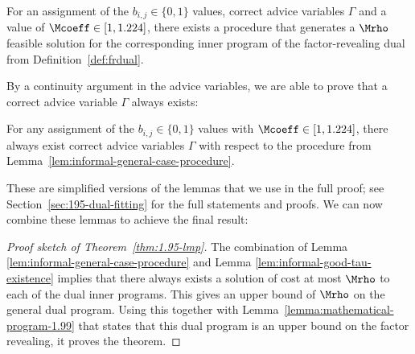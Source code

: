 
\begin{lemma}\label{lem:informal-general-case-procedure}
    For an assignment of the $b_{i,j}\in\{0,1\}$ values, correct advice variables $\Gamma$ and a value of $\Mcoeff\in[1,1.224]$, there exists a procedure that generates a $\Mrho$ feasible solution for the corresponding inner program of the factor-revealing dual from Definition~\ref{def:frdual}.
\end{lemma}

By a continuity argument in the advice variables, we are able to prove that a correct advice variable $\Gamma$ always exists:

\begin{lemma}\label{lem:informal-good-tau-existence}
    For any assignment of the $b_{i,j}\in\{0,1\}$ values with $\Mcoeff\in[1,1.224]$, there always exist correct advice variables $\Gamma$ with respect to the procedure from Lemma~\ref{lem:informal-general-case-procedure}.
\end{lemma}

These are simplified versions of the lemmas that we use in the full proof; see Section~\ref{sec:195-dual-fitting} for the full statements and proofs. We can now combine these lemmas to achieve the final result:

\begin{proof}[Proof sketch of Theorem~\ref{thm:1.95-lmp}]
    The combination of Lemma \ref{lem:informal-general-case-procedure} and Lemma \ref{lem:informal-good-tau-existence} implies that there always exists a solution of cost at most $\Mrho$ to each of the dual inner programs. This gives an upper bound of $\Mrho$ on the general dual program. Using this together with Lemma~\ref{lemma:mathematical-program-1.99} that states that this dual program is an upper bound on the factor revealing, it proves the theorem.
\end{proof}

